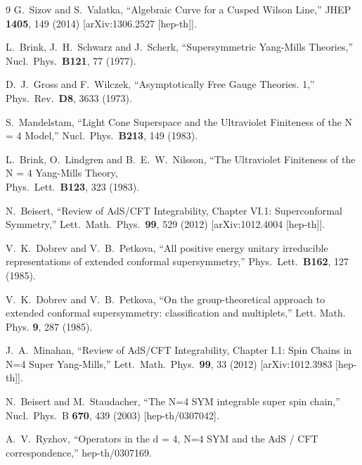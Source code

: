 \documentclass[a4paper,11pt]{article}
\numberwithin{equation}{section}
\begin{document}
\begin{thebibliography} {9}
  G.~Sizov and S.~Valatka,
  ``Algebraic Curve for a Cusped Wilson Line,''
  JHEP {\bf 1405}, 149 (2014)
  [arXiv:1306.2527 [hep-th]].

 L.~Brink, J.~H.~Schwarz and J.~Scherk, 
 ``Supersymmetric Yang-Mills Theories,''
  Nucl.\ Phys.\ {\bf B121}, 77 (1977).

	D.~J.~Gross and F.~Wilczek, 
	``Asymptotically Free Gauge Theories. 1,''
	Phys.\ Rev.\ {\bf D8}, 3633 (1973).

	S.~Mandelstam,
	``Light Cone Superspace and the Ultraviolet Finiteness of the N = 4 Model,''
	Nucl.\ Phys.\ {\bf B213}, 149 (1983).

	L.~Brink, O.~Lindgren and B.~E.~W.~Nilsson,
	``The Ultraviolet Finiteness of the N = 4 Yang-Mills Theory,\\
	Phys.\ Lett.\ {\bf B123}, 323 (1983).

  N.~Beisert,
  ``Review of AdS/CFT Integrability, Chapter VI.1: Superconformal Symmetry,''
  Lett.\ Math.\ Phys.\  {\bf 99}, 529 (2012)
  [arXiv:1012.4004 [hep-th]].

	V.~K.~Dobrev and V.~B.~Petkova, 
	``All positive energy unitary irreducible representations of extended conformal supersymmetry,''
	Phys.\ Lett.\ {\bf B162}, 127 (1985).

	V.~K.~Dobrev and V.~B.~Petkova,
	``On the group-theoretical approach to extended conformal supersymmetry: classification and multiplets,''
	Lett. Math. Phys. {\bf 9}, 287 (1985).

  J.~A.~Minahan,
  ``Review of AdS/CFT Integrability, Chapter I.1: Spin Chains in N=4 Super Yang-Mills,''
  Lett.\ Math.\ Phys.\  {\bf 99}, 33 (2012)
  [arXiv:1012.3983 [hep-th]].

  N.~Beisert and M.~Staudacher,
  ``The N=4 SYM integrable super spin chain,''
  Nucl.\ Phys.\ B {\bf 670}, 439 (2003)
  [hep-th/0307042].

  A.~V.~Ryzhov,
  ``Operators in the d = 4, N=4 SYM and the AdS / CFT correspondence,''
  hep-th/0307169.


\end{thebibliography}
\end{document}
